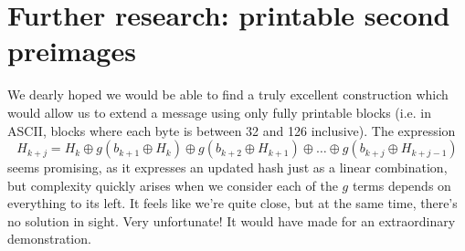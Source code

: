 \documentclass[11pt]{llncs}
\begin{document}
\newpage
\section{Further research: printable second preimages}

We dearly hoped we would be able to find a truly excellent construction which would allow us to extend a message using only fully printable blocks (i.e. in ASCII, blocks where each byte is between 32 and 126 inclusive). The expression
\[ H_{k+j} = H_k \oplus g(b_{k+1} \oplus H_k) \oplus g(b_{k+2} \oplus H_{k+1}) \oplus \dots  \oplus g(b_{k+j} \oplus H_{k+j-1}) \]
seems promising, as it expresses an updated hash just as a linear combination, but complexity quickly arises when we consider each of the $g$ terms depends on everything to its left. It feels like we're quite close, but at the same time, there's no solution in sight. Very unfortunate! It would have made for an extraordinary demonstration.
\end{document}
